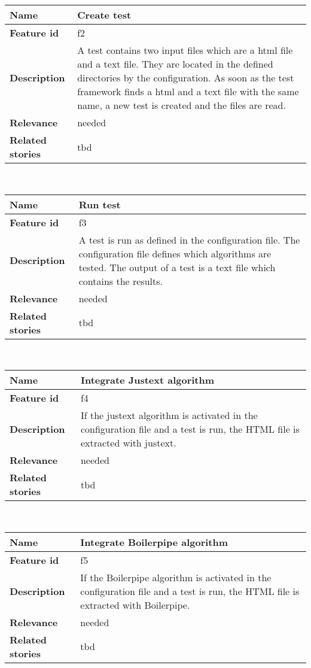 	\begin{tabular}{ | p{3cm} | p{12cm} |}
	\hline
	\textbf{Name} 				& Create test \\ \hline
	\textbf{Feature id} 		& f2 \\ \hline
	\textbf{Description} 		& A test contains two input files which are a html file and a text file. They are located in the defined directories by the configuration. As soon as the test framework finds a html and a text file with the same name, a new test is created and the files are read.\\ \hline
	\textbf{Relevance} 			& needed \\ \hline
	\textbf{Related stories} 	& tbd \\ \hline
	\end{tabular} \\

	\begin{tabular}{ | p{3cm} | p{12cm} |}
	\hline
	\textbf{Name} 				& Run test \\ \hline
	\textbf{Feature id} 		& f3 \\ \hline
	\textbf{Description} 		& A test is run as defined in the configuration file. The configuration file defines which algorithms are tested. The output of a test is a text file which contains the results. \\ \hline
	\textbf{Relevance} 			& needed \\ \hline
	\textbf{Related stories} 	& tbd \\ \hline
	\end{tabular} \\

	\begin{tabular}{ | p{3cm} | p{12cm} |}
	\hline
	\textbf{Name} 				& Integrate Justext algorithm \\ \hline
	\textbf{Feature id} 		& f4 \\ \hline
	\textbf{Description} 		& If the justext algorithm is activated in the configuration file and a test is run, the HTML file is extracted with justext. \\ \hline
	\textbf{Relevance} 			& needed \\ \hline
	\textbf{Related stories} 	& tbd \\ \hline
	\end{tabular} \\


	\begin{tabular}{ | p{3cm} | p{12cm} |}
	\hline
	\textbf{Name} 				& Integrate Boilerpipe algorithm \\ \hline
	\textbf{Feature id} 		& f5 \\ \hline
	\textbf{Description} 		& If the Boilerpipe algorithm is activated in the configuration file and a test is run, the HTML file is extracted with Boilerpipe. \\ \hline
	\textbf{Relevance} 			& needed \\ \hline
	\textbf{Related stories} 	& tbd \\ \hline
	\end{tabular} \\

